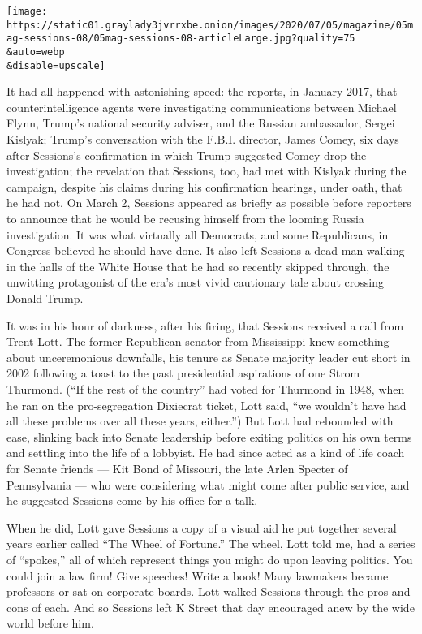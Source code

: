 \texttt{[image: https://static01.graylady3jvrrxbe.onion/images/2020/07/05/magazine/05mag-sessions-08/05mag-sessions-08-articleLarge.jpg?quality=75\\\&auto=webp\\\&disable=upscale]}

It had all happened with astonishing speed: the reports, in January
2017, that counterintelligence agents were investigating communications
between Michael Flynn, Trump's national security adviser, and the
Russian ambassador, Sergei Kislyak; Trump's conversation with the F.B.I.
director, James Comey, six days after Sessions's confirmation in which
Trump suggested Comey drop the investigation; the revelation that
Sessions, too, had met with Kislyak during the campaign, despite his
claims during his confirmation hearings, under oath, that he had not. On
March 2, Sessions appeared as briefly as possible before reporters to
announce that he would be recusing himself from the looming Russia
investigation. It was what virtually all Democrats, and some
Republicans, in Congress believed he should have done. It also left
Sessions a dead man walking in the halls of the White House that he had
so recently skipped through, the unwitting protagonist of the era's most
vivid cautionary tale about crossing Donald Trump.

It was in his hour of darkness, after his firing, that Sessions received
a call from Trent Lott. The former Republican senator from Mississippi
knew something about unceremonious downfalls, his tenure as Senate
majority leader cut short in 2002 following a toast to the past
presidential aspirations of one Strom Thurmond. (``If the rest of the
country'' had voted for Thurmond in 1948, when he ran on the
pro-segregation Dixiecrat ticket, Lott said, ``we wouldn't have had all
these problems over all these years, either.'') But Lott had rebounded
with ease, slinking back into Senate leadership before exiting politics
on his own terms and settling into the life of a lobbyist. He had since
acted as a kind of life coach for Senate friends --- Kit Bond of
Missouri, the late Arlen Specter of Pennsylvania --- who were
considering what might come after public service, and he suggested
Sessions come by his office for a talk.

When he did, Lott gave Sessions a copy of a visual aid he put together
several years earlier called ``The Wheel of Fortune.'' The wheel, Lott
told me, had a series of ``spokes,'' all of which represent things you
might do upon leaving politics. You could join a law firm! Give
speeches! Write a book! Many lawmakers became professors or sat on
corporate boards. Lott walked Sessions through the pros and cons of
each. And so Sessions left K Street that day encouraged anew by the wide
world before him.

